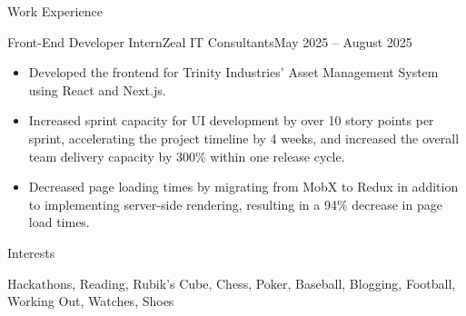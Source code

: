 \documentclass[]{mcdowellcv}
\begin{document}
		\begin{cvsection}{Work Experience}
		\begin{cvsubsection}{Front-End Developer Intern}{Zeal IT Consultants}{May 2025 -- August 2025}			
			\begin{itemize}
				\item Developed the frontend for Trinity Industries' Asset Management System using React and Next.js.
				\smallskip
				\item Increased sprint capacity for UI development by over 10 story points per sprint, accelerating the project timeline by 4 weeks, and increased the overall team delivery capacity by 300\% within one release cycle.
				\smallskip
				\item Decreased page loading times by migrating from MobX to Redux in addition to implementing server-side rendering, resulting in a 94\% decrease in page load times.
			\end{itemize}
		\end{cvsubsection}
	\end{cvsection}

	\begin{cvsection}{Interests}
		\begin{cvsubsection}{}{}{}
			\medskip
				Hackathons, Reading, Rubik's Cube, Chess, Poker, Baseball, Blogging, Football, Working Out, Watches, Shoes
		\end{cvsubsection}
	\end{cvsection}

	
\end{document}
